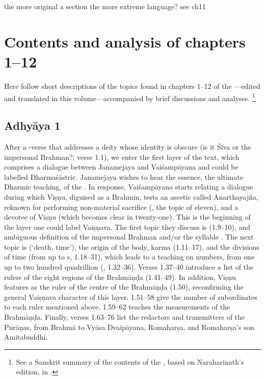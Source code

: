   


\CHECK the more original a section the more extreme language? see ch11


\vfill
\pagebreak


\section{Contents and analysis of chapters 1--12}\label{contentsof1_12}

Here follow short descriptions of the topics found in chapters 1--12
of the \VSS---edited and translated in this volume---accompanied 
by brief discussions and analyses.%
		\footnote{See a Sanskrit summary of the 
					contents of the \VSS,
				    based on Naraharinath's edition,
					in \verify. }
					
\subsection{Adhyāya 1}\label{contents_of_ch01}
After a -verse that addresses a 
deity whose identity is obscure (is it Śiva or the 
impersonal Brahman?; verse 1.1), we enter the first layer 
of the text, which comprises a dialogue between Janamejaya and 
Vaiśampāyana and could be labelled Dharmaśāstric.
Janamejaya wishes to hear the essence, the ultimate Dharmic teaching, 
of the \MBh. In response, Vaiśampāyana starts relating 
a dialogue during which Viṣṇu, diguised as a Brahmin, 
tests an ascetic called Anarthayajña, reknown for performing 
non-material sacrifice (, 
the topic of  eleven), and 
a devotee of Viṣṇu (which becomes clear in  twenty-one). 
This is the beginning of the layer one could label Vaiṣṇava. 
The first topic they discuss is  (1.9--10), and 
ambiguous definition of the impersonal Brahman and/or the syllable . 
The next topic is  (`death, time'), the origin of the body, karma (1.11--17), 
and the divisions of time (from  up to s, 1.18--31), 
which leads to a teaching on numbers, from one up to 
two hundred quadrillion (, 1.32--36).
Verses 1.37--40 introduce a list of the rulers of the eight 
regions of the Brahmāṇḍa (1.41--49). 
In addition, Viṣṇu features as the ruler of the centre of the Brahmāṇḍa (1.50),  
reconfirming the general Vaiṣṇava character of this layer. 
1.51--58 give the number of subordinates to each ruler mentioned above. 
1.59--62 teaches the measurements of the Brahmāṇḍa. 
Finally, verses 1.63--76 list the redactors and transmitters of the Purāṇas, 
from Brahmā to Vyāsa Dvaipāyana, Romaharṣa, and Romaharṣa's son Amitabuddhi.

